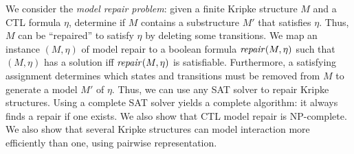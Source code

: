 
We consider the \emph{model repair problem}: given a finite Kripke structure $M$ and a CTL formula $\eta$, determine if
$M$ contains a substructure $M'$ that satisfies $\eta$. Thus, $M$ can be ``repaired'' to satisfy $\eta$ by deleting some
transitions.
We map an instance $(M, \eta)$ of model repair to a boolean formula $\mathit{repair}(M,\eta)$ such that $(M, \eta)$ has a
solution iff $\mathit{repair}(M,\eta)$ is satisfiable. Furthermore, a satisfying assignment determines which states and
transitions must be removed from $M$ to generate a model $M'$ of $\eta$. Thus, we can use any SAT solver to repair
Kripke structures.  Using a complete SAT solver yields a complete algorithm: it always finds a repair if one exists.  We
also show that CTL model repair is NP-complete.
We also show that several Kripke structures can model interaction more efficiently than one, using pairwise representation.
%





